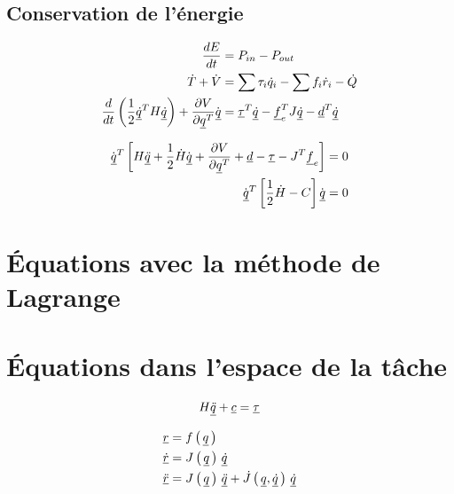 %


\subsection{Conservation de l'énergie}

\begin{align}
\frac{dE}{dt}     &= P_{in} - P_{out} \\
\dot{T} + \dot{V}  &= \sum \tau_i \dot{q}_i  - \sum f_i \dot{r}_i - \dot{Q} \\
\frac{d}{dt}\left( \frac{1}{2} \underline{\dot{q}}^T H \underline{\dot{q}} \right) + \frac{\partial V}{\partial \underline{q}^T} \dot{\underline{q}} &= \underline{\tau}^T \underline{\dot{q}}  - \underline{f}_e^T J \underline{\dot{q}} - \underline{d}^T \underline{\dot{q}}
\end{align}

\begin{align}
\dot{\underline{q}}^T \left[ H \underline{\ddot{q}} + \frac{1}{2}\dot{H}\dot{\underline{q}} + \frac{\partial V}{\partial \underline{q}^T} + \underline{d} - \underline{\tau} - J^T \underline{f}_e  \right] &= 0 \\
\dot{\underline{q}}^T \left[ \frac{1}{2}\dot{H} - C \right] \dot{\underline{q}} &= 0
\end{align}




\newpage
\section{Équations avec la méthode de Lagrange}
\label{sec:lagrange}




\newpage
\section{Équations dans l'espace de la tâche}
\label{sec:taskdynamics}

\begin{align}
H \underline{\ddot{q}} + \underline{c} = \underline{\tau} 
\label{eq:manipulator_short2}
\end{align}

\begin{align}
\underline{r} &= f\left( \, \underline{q} \, \right) \\
\underline{\dot{r}} &= J\left( \, \underline{q} \, \right) \, \underline{\dot{q}} \\
\underline{\ddot{r}} &= J\left( \, \underline{q} \, \right) \, \underline{\ddot{q}}  + \dot{J} \left( \, \underline{q}  , \underline{\dot{q}} \, \right) \, \underline{\dot{q}} 
\end{align}


